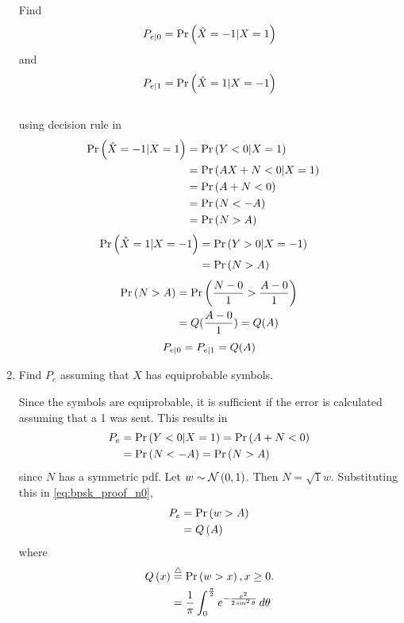 \documentclass[10pt, a4paper]{article}
\begin{document}
\begin{enumerate}
\label{ml-ch4_sim}
Find 
\begin{equation}
	P_{e|0} = \Pr\left(\hat{X} = -1|X=1\right)
\end{equation}
and 
\begin{equation}
	P_{e|1} = \Pr\left(\hat{X} = 1|X=-1\right)
\end{equation}\\
\solution using decision rule in 
\begin{align}
	\Pr\left(\hat{X} = -1|X=1\right) &= \Pr\left(Y < 0|X=1\right)&\\
	&= \Pr\left(AX + N < 0|X=1\right)&\\ 
	&= \Pr\left(A + N < 0\right)&\\
	&= \Pr\left(N < -A\right)\\
        &= \Pr\left(N > A\right)
\end{align}
\begin{align}
	\Pr\left(\hat{X} = 1|X=-1\right) &= \Pr\left(Y > 0|X=-1\right)&\\
	&= \Pr\left(N > A\right)
\end{align}
\begin{align*}
  \Pr\left(N > A\right)&=\Pr\left(\frac{N-0}{1}> \frac{A-0}{1}\right)\\&=Q(\frac{A-0}{1})=Q(A)
\end{align*}
\begin{equation}
   P_{e|0} = P_{e|1}=Q(A)\\ 
\end{equation}
\item Find $P_e$ assuming that $X$ has equiprobable symbols.\\
\solution

Since the symbols are equiprobable, it is sufficient if the error is calculated assuming that a 1 was sent.  This results in
\begin{align}
P_e &= \Pr\left(Y < 0|X=1\right) = \Pr\left(A + N < 0\right)
\\
&= \Pr\left( N< -A \right) = \Pr\left( N > A \right)
\label{eq:bpsk_proof_n0}
\end{align}
since $N$ has a symmetric pdf.
Let $w \sim \mathcal{N}\left(0,1\right)$.  Then $N = \sqrt{1}w$. Substituting this in \eqref{eq:bpsk_proof_n0},
\begin{align}
P_e &=  \Pr\left( w > A \right)
\\
&= Q\left(A\right)
\end{align}
%
where 
\begin{align}
\label{eq:qfunc_def}
Q\left(x\right) &\stackrel{\triangle}{=} \Pr\left(w > x\right), x \ge 0 .
\\
&= \frac{1}{\pi}\int^{\frac{\pi}{2}}_{0}e^{-\frac{x^2}{2\sin^2 \theta}}\,d\theta
\end{align}



\end{enumerate}
\end{document}

